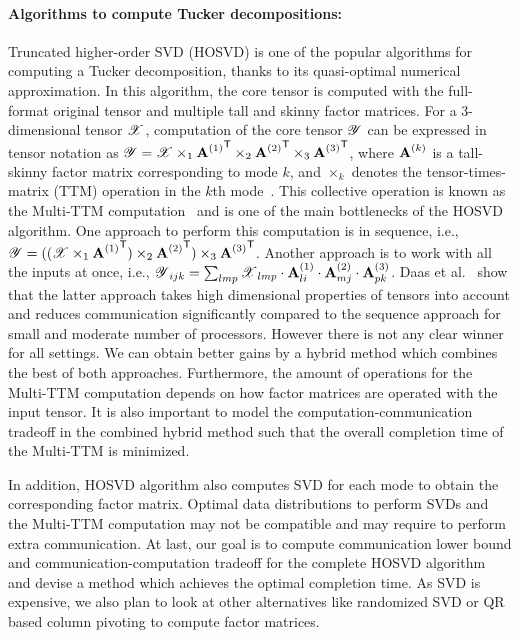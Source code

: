 \documentclass[a4paper,11pt]{article}
\newcommand{\X}{\T{X}}
\newcommand{\Y}{\T{Y}}
\newcommand{\bora}[1]{{\color{magenta} \emph{#1}}}
\renewcommand{\bora}[1]{}
\begin{document}
	\paragraph{Algorithms to compute Tucker decompositions:}
	Truncated higher-order SVD (HOSVD) is one of the popular algorithms for computing a Tucker decomposition, thanks to its quasi-optimal numerical approximation. In this algorithm, the core tensor is computed with the full-format original tensor and multiple tall and skinny factor matrices. For a 3-dimensional tensor $\X$, computation of the core tensor $\Y$ can be expressed in tensor notation as $\Y = \X \times_1 {\Mn{A}{1}}^\Tra \times_2 {\Mn{A}{2}}^\Tra \times_3 {\Mn{A}{3}}^\Tra$, where 
	$\Mn{A}{k}$ is a tall-skinny factor matrix corresponding to mode $k$, and $\times_k$ denotes the tensor-times-matrix (TTM) operation in the $k$th mode~\cite{KB-SIAM-2009}. This collective operation is known as the Multi-TTM computation~\cite{ABGKR-SIMAX-2022} and is one of the main bottlenecks of the HOSVD algorithm. One approach to perform this computation is in sequence, i.e., $\Y = ((\X \times_1 {\Mn{A}{1}}^\Tra )\times_2 {\Mn{A}{2}}^\Tra) \times_3 {\Mn{A}{3}}^\Tra$. Another approach is to work with all the inputs at once, i.e., $\Y_{ijk} = \sum_{lmp}\X_{lmp}\cdot\Mn{A}{1}_{li}\cdot \Mn{A}{2}_{mj}\cdot \Mn{A}{3}_{pk}$.
	Daas et al.~\cite{ABGKR-SIMAX-2022} show that the latter approach takes high dimensional properties of tensors into account and reduces communication significantly compared to the sequence approach for small and moderate number of processors. However there is not any clear winner for all settings. We can obtain better gains by a hybrid method which combines the best of both approaches. Furthermore, the amount of operations for the Multi-TTM computation depends on how factor matrices are operated with the input tensor. It is also important to model the computation-communication tradeoff in the combined hybrid method such that the overall completion time of the Multi-TTM is minimized.
	
	In addition, HOSVD algorithm also computes SVD for each mode to obtain the corresponding factor matrix. Optimal data distributions to perform SVDs and the Multi-TTM computation may not be compatible and may require to perform extra communication. At last, our goal is to compute communication lower bound and communication-computation tradeoff for the complete HOSVD algorithm and devise a method which achieves the optimal completion time. As SVD is expensive, we also plan to look at other alternatives like randomized SVD or QR based column pivoting to compute factor matrices.
	
\end{document}
